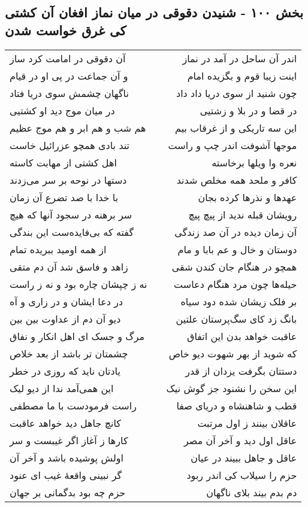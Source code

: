 \begin{center}
\section*{بخش ۱۰۰ - شنیدن دقوقی در میان نماز افغان  آن کشتی کی غرق خواست شدن}
\label{sec:sh100}
\begin{longtable}{l p{0.5cm} r}
آن دقوقی در امامت کرد ساز
&&
اندر آن ساحل در آمد در نماز
\\
و آن جماعت در پی او در قیام
&&
اینت زیبا قوم و بگزیده امام
\\
ناگهان چشمش سوی دریا فتاد
&&
چون شنید از سوی دریا داد داد
\\
در میان موج دید او کشتیی
&&
در قضا و در بلا و زشتیی
\\
هم شب و هم ابر و هم موج عظیم
&&
این سه تاریکی و از غرقاب بیم
\\
تند بادی همچو عزرائیل خاست
&&
موجها آشوفت اندر چپ و راست
\\
اهل کشتی از مهابت کاسته
&&
نعره وا ویلها برخاسته
\\
دستها در نوحه بر سر می‌زدند
&&
کافر و ملحد همه مخلص شدند
\\
با خدا با صد تضرع آن زمان
&&
عهدها و نذرها کرده بجان
\\
سر برهنه در سجود آنها که هیچ
&&
رویشان قبله ندید از پیچ پیچ
\\
گفته که بی‌فایده‌ست این بندگی
&&
آن زمان دیده در آن صد زندگی
\\
از همه اومید ببریده تمام
&&
دوستان و خال و عم بابا و مام
\\
زاهد و فاسق شد آن دم متقی
&&
همچو در هنگام جان کندن شقی
\\
نه ز چپشان چاره بود و نه ز راست
&&
حیله‌ها چون مرد هنگام دعاست
\\
در دعا ایشان و در زاری و آه
&&
بر فلک زیشان شده دود سیاه
\\
دیو آن دم از عداوت بین بین
&&
بانگ زد کای سگ‌پرستان علتین
\\
مرگ و جسک ای اهل انکار و نفاق
&&
عاقبت خواهد بدن این اتفاق
\\
چشمتان تر باشد از بعد خلاص
&&
که شوید از بهر شهوت دیو خاص
\\
یادتان ناید که روزی در خطر
&&
دستتان بگرفت یزدان از قدر
\\
این همی‌آمد ندا از دیو لیک
&&
این سخن را نشنود جز گوش نیک
\\
راست فرمودست با ما مصطفی
&&
قطب و شاهنشاه و دریای صفا
\\
کانچ جاهل دید خواهد عاقبت
&&
عاقلان بینند ز اول مرتبت
\\
کارها ز آغاز اگر غیبست و سر
&&
عاقل اول دید و آخر آن مصر
\\
اولش پوشیده باشد و آخر آن
&&
عاقل و جاهل ببیند در عیان
\\
گر نبینی واقعهٔ غیب ای عنود
&&
حزم را سیلاب کی اندر ربود
\\
حزم چه بود بدگمانی بر جهان
&&
دم بدم بیند بلای ناگهان
\\
\end{longtable}
\end{center}
